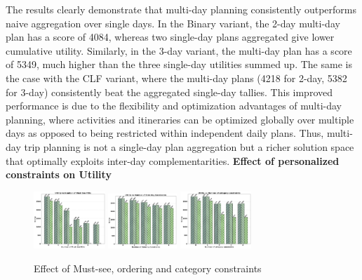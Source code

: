 The results clearly demonstrate that multi-day planning consistently outperforms naive aggregation over single days. In the Binary variant, the 2-day multi-day plan has a score of 4084, whereas two single-day plans aggregated give lower cumulative utility. Similarly, in the 3-day variant, the multi-day plan has a score of 5349, much higher than the three single-day utilities summed up. The same is the case with the CLF variant, where the multi-day plans (4218 for 2-day, 5382 for 3-day) consistently beat the aggregated single-day tallies. This improved performance is due to the flexibility and optimization advantages of multi-day planning, where activities and itineraries can be optimized globally over multiple days as opposed to being restricted within independent daily plans. Thus, multi-day trip planning is not a single-day plan aggregation but a richer solution space that optimally exploits inter-day complementarities.
\noindent\textbf{Effect of personalized constraints on Utility}
\begin{figure}[th]
\includegraphics[width=0.24\textwidth]{plots/mustsee_pkj.png}
\includegraphics[width=0.23\textwidth]{plots/ordering_pkj.png}
\includegraphics[width=0.24\textwidth]{plots/category_pkj.png}
\caption{Effect of Must-see, ordering and category constraints}
\label{fig:personalizedconstraints}
\end{figure}

